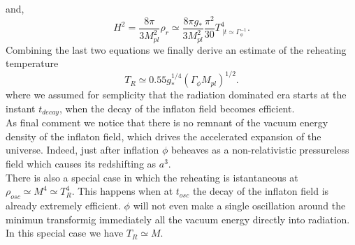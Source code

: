 \documentclass[11pt,a4paper,twoside]{book}
\begin{document}
and,
\begin{equation}
	H^{2}=\frac{8\pi }{3M_{pl}^{2}}\rho_{r}\simeq \frac{8 \pi g_{*}}{3M_{pl}^{2}}\frac{\pi^{2}}{30}T^{4}_{\ |t\simeq \Gamma_{\phi}^{-1}}.
\end{equation}
Combining the last two equations we finally derive an estimate of the reheating temperature
\begin{equation}
	\label{Chap2:reheatingTemperature}
	T_{R} \simeq 0.55g_{*}^{1/4}(\Gamma_{\phi}M_{pl})^{1/2}.
\end{equation}
where we assumed for semplicity that the radiation dominated era starts at the instant $ t_{decay} $, when the decay of the inflaton field becomes efficient.\\ 
As final comment we notice that there is no remnant of the vacuum energy density of the inflaton field, which drives the accelerated expansion of the universe. Indeed, just after inflation $\phi$ beheaves as a non-relativistic pressureless field which causes its redshifting as $ a^{3} $.\\
There is also a special case in which the reheating is istantaneous at $ \rho_{osc} \simeq M^{4} \simeq T^{4}_{R} $. This happens when at $ t_{osc} $ the decay of the inflaton field is already extremely efficient. $\phi$ will not even make a single oscillation around the minimun transformig immediately all the vacuum energy directly into radiation. In this special case we have $ T_{R} \simeq M $.
\end{document}
